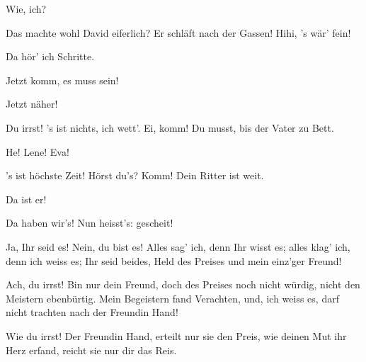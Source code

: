 \begin{drama}
\Magdalenespeaks
Wie, ich?


Das machte wohl David eiferlich?
Er schläft nach der Gassen! Hihi, 's wär' fein!

\Evaspeaks
Da hör' ich Schritte.

\Magdalenespeaks


Jetzt komm, es muss sein!

\Evaspeaks
Jetzt näher!

\Magdalenespeaks
Du irrst! 's ist nichts, ich wett'.
Ei, komm! Du musst, bis der Vater zu Bett.



He! Lene! Eva!

\Magdalenespeaks

's ist höchste Zeit!
Hörst du's? Komm! Dein Ritter ist weit.




\scene


\Evaspeaks
Da ist er!

\Magdalenespeaks
Da haben wir's! Nun heisst's:
gescheit!



\Evaspeaks


Ja, Ihr seid es! Nein, du bist es!
Alles sag' ich, denn Ihr wisst es;
alles klag' ich, denn ich weiss es;
Ihr seid beides, Held des Preises
und mein einz'ger Freund!

\Waltherspeaks


Ach, du irrst! Bin nur dein Freund, doch des Preises
noch nicht würdig, nicht den Meistern ebenbürtig.
Mein Begeistern fand Verachten,
und, ich weiss es, darf nicht trachten
nach der Freundin Hand!

\Evaspeaks

Wie du irrst! Der Freundin Hand,
erteilt nur sie den Preis,
wie deinen Mut ihr Herz erfand,
reicht sie nur dir das Reis.


\end{drama}
